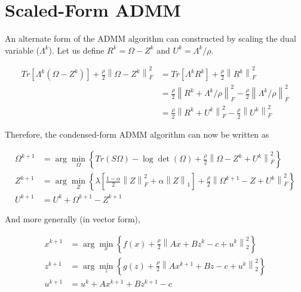 \documentclass[12pt,]{book}
\theoremstyle{definition}
\theoremstyle{definition}
\theoremstyle{definition}
\theoremstyle{remark}
\begin{document}
\vspace{1cm}

\hypertarget{scaled-form-admm}{%
\section{Scaled-Form ADMM}\label{scaled-form-admm}}

An alternate form of the ADMM algorithm can constructed by scaling the
dual variable (\(\Lambda^{k}\)). Let us define
\(R^{k} = \Omega - Z^{k}\) and \(U^{k} = \Lambda^{k}/\rho\).

\begin{align*}
  Tr\left[ \Lambda^{k}\left( \Omega - Z^{k} \right) \right] + \frac{\rho}{2}\left\| \Omega - Z^{k} \right\|_{F}^{2} &= Tr\left[ \Lambda^{k}R^{k} \right] + \frac{\rho}{2}\left\| R^{k} \right\|_{F}^{2} \\
  &= \frac{\rho}{2}\left\| R^{k} + \Lambda^{k}/\rho \right\|_{F}^{2} - \frac{\rho}{2}\left\| \Lambda^{k}/\rho \right\|_{F}^{2} \\
  &= \frac{\rho}{2}\left\| R^{k} + U^{k} \right\|_{F}^{2} - \frac{\rho}{2}\left\| U^{k} \right\|_{F}^{2}
\end{align*}

Therefore, the condensed-form ADMM algorithm can now be written as

\begin{align}
  \Omega^{k + 1} &= \arg\min_{\Omega}\left\{ Tr\left(S\Omega\right) - \log\det\left(\Omega\right) + \frac{\rho}{2}\left\| \Omega - Z^{k} + U^{k} \right\|_{F}^{2} \right\} \\
  Z^{k + 1} &= \arg\min_{Z}\left\{ \lambda\left[ \frac{1 - \alpha}{2}\left\| Z \right\|_{F}^{2} + \alpha\left\| Z \right\|_{1} \right] + \frac{\rho}{2}\left\| \Omega^{k + 1} - Z + U^{k} \right\|_{F}^{2} \right\} \\
  U^{k + 1} &= U^{k} + \Omega^{k + 1} - Z^{k + 1}
\end{align}

And more generally (in vector form),

\begin{align}
  x^{k + 1} &= \arg\min_{x}\left\{ f(x) + \frac{\rho}{2}\left\| Ax + Bz^{k} - c + u^{k} \right\|_{2}^{2} \right\} \\
  z^{k + 1} &= \arg\min_{z}\left\{ g(z) + \frac{\rho}{2}\left\| Ax^{k + 1} + Bz - c + u^{k} \right\|_{2}^{2} \right\} \\
  u^{k + 1} &= u^{k} + Ax^{k + 1} + Bz^{k + 1} - c
\end{align}
\end{document}
